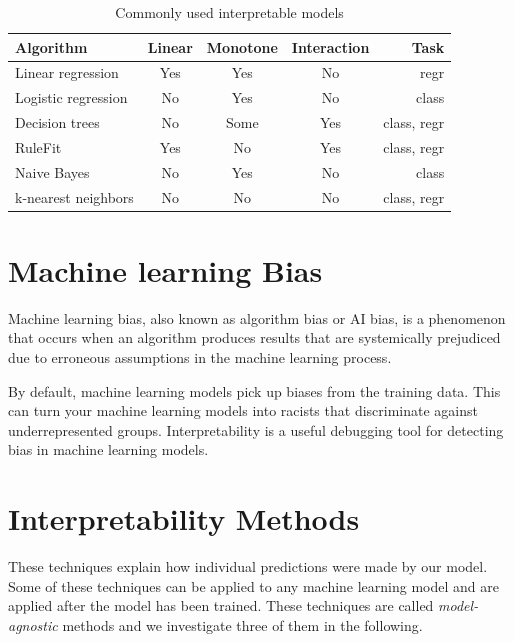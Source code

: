 \documentclass[a4paper, 10pt,]{JournalArticle}
\begin{document}
\begin{table}[tp]
\centering
\caption{Commonly used interpretable models}
\begin{tabular}{lcccr}
\hline
\textbf{Algorithm}  & \textbf{Linear} & \textbf{Monotone} & \textbf{Interaction} & \textbf{Task} \\ \hline
Linear regression   & Yes             & Yes               & No                   & regr          \\ \hline
Logistic regression & No              & Yes               & No                   & class         \\ \hline
Decision trees      & No              & Some              & Yes                  & class, regr    \\ \hline
RuleFit             & Yes             & No                & Yes                  & class, regr    \\ \hline
Naive Bayes         & No              & Yes               & No                   & class         \\ \hline
k-nearest neighbors & No              & No                & No                   & class, regr    \\ \hline
\end{tabular}
\label{tab:algo-table}
\end{table}

\section{Machine learning Bias}

Machine learning bias, also known as algorithm bias or AI bias, is a phenomenon that occurs when an algorithm produces results that are systemically prejudiced due to erroneous assumptions in the machine learning process.

By default, machine learning models pick up biases from the training data. This can turn your machine learning models into racists that discriminate against underrepresented groups. Interpretability is a useful debugging tool for detecting bias in machine learning models.


\section{Interpretability Methods}

These techniques explain how individual predictions were made by our model. Some of these techniques can be applied to any machine learning model and are applied after the model has been trained. These techniques are called \textit{model-agnostic} methods and we investigate three of them in the following.
\end{document}
